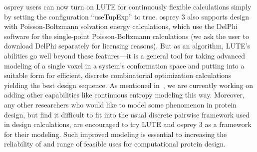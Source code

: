 {\sc osprey} users can now turn on LUTE for continuously flexible calculations simply by setting the configuration ``useTupExp'' to true.  {\sc osprey} 3 also supports design with Poisson-Boltzmann solvation energy calculations, which use the DelPhi~\cite{OSOR,DelPhi_surface} software for the single-point Poisson-Boltzmann calculations (we ask the user to download DelPhi separately for licensing reasons).  But as an algorithm, LUTE's abilities go well beyond these features---it is a general tool for taking advanced modeling of a single voxel in a system's conformation space and putting into a suitable form for efficient, discrete combinatorial optimization calculations yielding the best design sequence.  As mentioned in~\cite{LUTE_RECOMB}, we are currently working on adding other capabilities like continuous entropy modeling this way.  Moreover, any other researchers who would like to model some phenomenon in protein design, but find it difficult to fit into the usual discrete pairwise framework used in design calculations, are encouraged to try LUTE and {\sc osprey} 3 as a framework for their modeling.  Such improved modeling is essential to increasing the reliability of and range of feasible uses for computational protein design.  